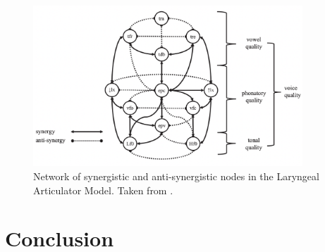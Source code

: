 \documentclass[12pt, letterpaper]{article}
\begin{document}
\begin{figure}[!ht]
	\centering
	\includegraphics[width=0.9\textwidth]{../LAMNetwork.png}
	\caption{Network of synergistic and anti-synergistic nodes in the Laryngeal Articulator Model. Taken from \citet{eslingVoiceQualityLaryngeal2019}.}
	\label{fig:LAMNetwork}
\end{figure}

\section{Conclusion} \label{sec:Conclusion}



\printbibliography[heading=bibintoc]
\end{document}
